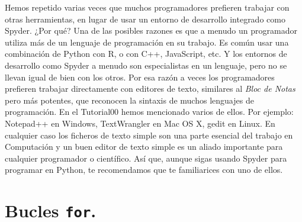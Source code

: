 \documentclass[10pt,a4paper]{article}\usepackage[]{graphicx}\usepackage[]{color}
\begin{document}
Hemos repetido varias veces que muchos programadores prefieren trabajar con otras herramientas, en lugar de usar un entorno de desarrollo integrado como Spyder.  ¿Por qué? Una de las posibles razones es que a menudo un programador utiliza más de un lenguaje de programación en su trabajo. Es común usar una combinación de Python con R, o con C++, JavaScript, etc. Y los entornos de desarrollo como Spyder a menudo son especialistas en un lenguaje, pero no se llevan igual de bien con los otros. Por esa razón a veces los programadores prefieren trabajar directamente con editores de texto, similares al {\em Bloc de Notas} pero más potentes, que reconocen la sintaxis de muchos lenguajes de programación. En el Tutorial00 hemos mencionado varios de ellos. Por ejemplo: Notepad++ en Windows, TextWrangler en Mac OS X, gedit en Linux. En cualquier caso los ficheros de texto simple son una parte esencial del trabajo en Computación y un buen editor de texto simple es un aliado importante para cualquier programador o científico. Así que, aunque sigas usando Spyder para 
programar en Python, te recomendamos que te familiarices con uno de ellos. 


\section{Bucles {\tt for}.}
\label{tut02py:sec:BuclesFor}
\end{document}
